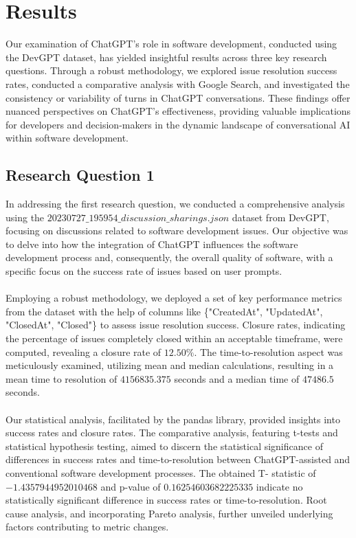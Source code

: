 \documentclass[journal]{IEEEtran}
\begin{document}
\section{Results}
Our examination of ChatGPT's role in software development, conducted using the DevGPT dataset, has yielded insightful results across three key research questions. Through a robust methodology, we explored issue resolution success rates, conducted a comparative analysis with Google Search, and investigated the consistency or variability of turns in ChatGPT conversations. These findings offer nuanced perspectives on ChatGPT's effectiveness, providing valuable implications for developers and decision-makers in the dynamic landscape of conversational AI within software development.

\subsection{Research Question 1}
In addressing the first research question, we conducted a comprehensive analysis using the $20230727\_195954\_discussion\_sharings.json$ dataset from DevGPT, focusing on discussions related to software development issues. Our objective was to delve into how the integration of ChatGPT influences the software development process and, consequently, the overall quality of software, with a specific focus on the success rate of issues based on user prompts. 
 \\ \\
Employing a robust methodology, we deployed a set of key performance metrics from the dataset with the help of columns like \{"CreatedAt", "UpdatedAt", "ClosedAt", "Closed"\} to assess issue resolution success. Closure rates, indicating the percentage of issues completely closed within an acceptable timeframe, were computed, revealing a closure rate of $12.50 \%$. The time-to-resolution aspect was meticulously examined, utilizing mean and median calculations, resulting in a mean time to resolution of $4156835.375$ seconds and a median time of $47486.5$ seconds.
\\ \\
Our statistical analysis, facilitated by the pandas library, provided insights into success rates and closure rates. The comparative analysis, featuring t-tests and statistical hypothesis testing, aimed to discern the statistical significance of differences in success rates and time-to-resolution between ChatGPT-assisted and conventional software development processes. The obtained T- statistic of $-1.4357944952010468$ and p-value of $0.16254603682225335$ indicate no statistically significant difference in success rates or time-to-resolution. Root cause analysis, and incorporating Pareto analysis, further unveiled underlying factors contributing to metric changes.
\end{document}
